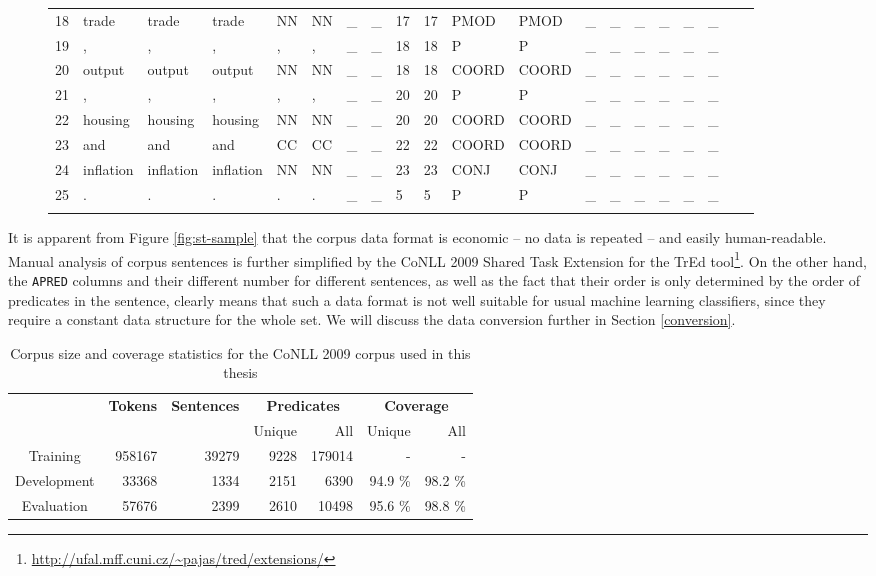 \documentclass[12pt,notitlepage]{report}
\begin{document}
\begin{figure}[htbp]
\begin{center}
{\begin{tabular}{llllllllllllllllllll}
18 & trade & trade & trade & NN & NN & \_ & \_ & 17 & 17 & PMOD & PMOD & \_ & \_ & \_ & \_ & \_ & \_\\
19 & , & , & , & , & , & \_ & \_ & 18 & 18 & P & P & \_ & \_ & \_ & \_ & \_ & \_\\
20 & output & output & output & NN & NN & \_ & \_ & 18 & 18 & COORD & COORD & \_ & \_ & \_ & \_ & \_ & \_\\
21 & , & , & , & , & , & \_ & \_ & 20 & 20 & P & P & \_ & \_ & \_ & \_ & \_ & \_\\
22 & housing & housing & housing & NN & NN & \_ & \_ & 20 & 20 & COORD & COORD & \_ & \_ & \_ & \_ & \_ & \_\\
23 & and & and & and & CC & CC & \_ & \_ & 22 & 22 & COORD & COORD & \_ & \_ & \_ & \_ & \_ & \_\\
24 & inflation & inflation & inflation & NN & NN & \_ & \_ & 23 & 23 & CONJ & CONJ & \_ & \_ & \_ & \_ & \_ & \_\\
25 & . & . & . & . & . & \_ & \_ & 5 & 5 & P & P & \_ & \_ & \_ & \_ & \_ & \_\\
\\
\end{tabular}
}
\end{center}
\end{figure}

It is apparent from Figure \ref{fig:st-sample} that the corpus data format is economic -- no data is repeated -- and easily human-readable. Manual analysis of corpus sentences is further simplified by the CoNLL 2009 Shared Task Extension for the TrEd tool\footnote{\url{http://ufal.mff.cuni.cz/\~pajas/tred/extensions/}}. On the other hand, the \texttt{APRED} columns and their different number for different sentences, as well as the fact that their order is only determined by the order of predicates in the sentence, clearly means that such a data format is not well suitable for usual machine learning classifiers, since they require a constant data structure for the whole set. We will discuss the data conversion further in Section \ref{conversion}.

\begin{table}[htbp]
\caption{Corpus size and coverage statistics for the CoNLL 2009 corpus used in this thesis}\label{tab:corpus-stats}
\begin{center}
\begin{tabular}{|c|rrrrrr|}\hline
  & \multirow{2}{*}{\bf Tokens} & \multirow{2}{*}{\bf Sentences} & \multicolumn{2}{c}{\bf Predicates} & \multicolumn{2}{c|}{\bf Coverage} \\
 & & & Unique & All & Unique & All \\\hline
Training & 958167 & 39279 & 9228 & 179014 & - & - \\
Development & 33368 & 1334 & 2151 & 6390 & 94.9 \% & 98.2 \% \\
Evaluation & 57676 & 2399 & 2610 & 10498 & 95.6 \% & 98.8 \% \\\hline
\end{tabular}
\end{center}
\end{table}
\end{document}
